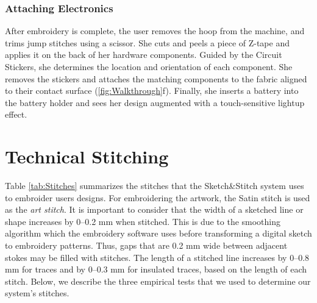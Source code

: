 \documentclass[header.tex]{subfiles}
\begin{document}

\subsubsection{Attaching Electronics}
After embroidery is complete, the user removes the hoop from the machine, and trims jump stitches using a scissor. She cuts and peels a piece of Z-tape and applies it on the back of her hardware components. Guided by the Circuit Stickers, she determines the location and orientation of each component. She removes the stickers and attaches the matching components to the fabric aligned to their contact surface (\ref{fig:Walkthrough}f). Finally, she inserts a battery into the battery holder and sees her design augmented with a touch-sensitive lightup effect.











\section{Technical Stitching}
Table \ref{tab:Stitches} summarizes the stitches that the Sketch\&Stitch system uses to embroider users designs. For embroidering the artwork, the Satin stitch is used as the \textit{art stitch}. It is important to consider that the width of a sketched line or shape increases by 0--0.2 mm when stitched. This is due to the smoothing algorithm which the embroidery software uses before transforming a digital sketch to embroidery patterns. Thus, gaps that are 0.2 mm wide between adjacent stokes may be filled with stitches. The length of a stitched line increases by 0--0.8 mm for traces and by 0--0.3 mm for insulated traces, based on the length of each stitch. Below, we describe the three empirical tests that we used to determine our system's stitches.
\end{document}

